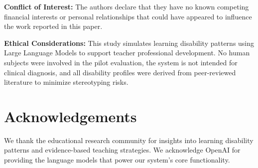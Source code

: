 \documentclass[11pt]{article}
\begin{document}
\textbf{Conflict of Interest:} The authors declare that they have no known competing financial interests or personal relationships that could have appeared to influence the work reported in this paper.

\textbf{Ethical Considerations:} This study simulates learning disability patterns using Large Language Models to support teacher professional development. No human subjects were involved in the pilot evaluation, the system is not intended for clinical diagnosis, and all disability profiles were derived from peer-reviewed literature to minimize stereotyping risks.

\section*{Acknowledgements}

We thank the educational research community for insights into learning disability patterns and evidence-based teaching strategies. We acknowledge OpenAI for providing the language models that power our system's core functionality.
\end{document}

